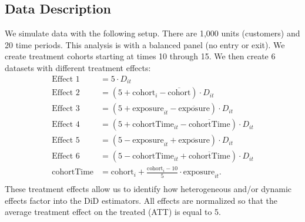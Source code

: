 \documentclass[12pt]{article}
\begin{document}
\subsection{Data Description}
We simulate data with the following setup. There are 1,000 units (customers) and 20 time periods. This analysis is with a balanced panel (no entry or exit). We create treatment cohorts starting at times 10 through 15. We then create 6 datasets with different treatment effects:
\begin{align*}
    \text{Effect 1} &= 5\cdot D_{it} \\
    \text{Effect 2} &= (5 + \text{cohort}_i - \overline{\text{cohort}})\cdot D_{it} \\
    \text{Effect 3} &= (5 + \text{exposure}_{it} - \overline{\text{exposure}})\cdot D_{it} \\
    \text{Effect 4} &= (5 + \text{cohortTime}_{it} - \overline{\text{cohortTime}})\cdot D_{it} \\
    \text{Effect 5} &= (5 - \text{exposure}_{it} + \overline{\text{exposure}})\cdot D_{it} \\
    \text{Effect 6} &= (5 - \text{cohortTime}_{it} + \overline{\text{cohortTime}})\cdot D_{it} \\
    \text{cohortTime} &= \text{cohort}_i + \frac{\text{cohort}_i-10}{5}\cdot \text{exposure}_{it}.\\
\end{align*}
These treatment effects allow us to identify how heterogeneous and/or dynamic effects factor into the DiD estimators. All effects are normalized so that the average treatment effect on the treated (ATT) is equal to 5.
\end{document}
